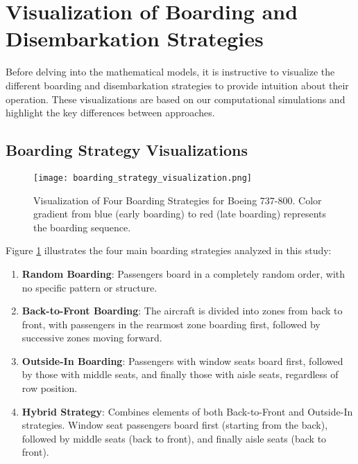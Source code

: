 \documentclass[12pt,a4paper]{article}
\begin{document}
\section{Visualization of Boarding and Disembarkation Strategies}

Before delving into the mathematical models, it is instructive to visualize the different boarding and disembarkation strategies to provide intuition about their operation. These visualizations are based on our computational simulations and highlight the key differences between approaches.

\subsection{Boarding Strategy Visualizations}

\begin{figure}[H]
\centering
\texttt{[image: boarding\_strategy\_visualization.png]}
\caption{Visualization of Four Boarding Strategies for Boeing 737-800. Color gradient from blue (early boarding) to red (late boarding) represents the boarding sequence.}
\label{fig:boarding_strategies}
\end{figure}

Figure \ref{fig:boarding_strategies} illustrates the four main boarding strategies analyzed in this study:

\begin{enumerate}
    \item \textbf{Random Boarding}: Passengers board in a completely random order, with no specific pattern or structure.
    
    \item \textbf{Back-to-Front Boarding}: The aircraft is divided into zones from back to front, with passengers in the rearmost zone boarding first, followed by successive zones moving forward.
    
    \item \textbf{Outside-In Boarding}: Passengers with window seats board first, followed by those with middle seats, and finally those with aisle seats, regardless of row position.
    
    \item \textbf{Hybrid Strategy}: Combines elements of both Back-to-Front and Outside-In strategies. Window seat passengers board first (starting from the back), followed by middle seats (back to front), and finally aisle seats (back to front).
\end{enumerate}
\end{document}
